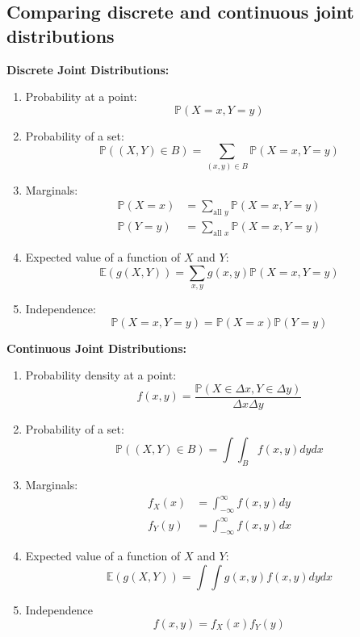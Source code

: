\documentclass[titlepage, 12pt, leqno]{article}
\begin{document}
\subsection{Comparing discrete and continuous joint distributions}
\begin{multicols}{2}
    \textbf{Discrete Joint Distributions:}
    \begin{enumerate}
        \item Probability at a point:
            \[
            \mathbb{P}(X=x, Y=y)
            \]
        \item Probability of a set:
            \[
            \mathbb{P}((X,Y) \in B) = 
            \sum_{(x,y) \in B}\mathbb{P}(X=x,Y=y)
            \]
        \item Marginals:
           \begin{align*}
               \mathbb{P}(X=x) &= \sum_{ \text{all $y$}} \mathbb{P}(X=x, Y=y) \\
               \mathbb{P}(Y=y) &= \sum_{ \text{all $x$}}\mathbb{P}(X=x,Y=y)
           \end{align*}

        \item Expected value of a function of $X$ and $Y$:
            \[
            \mathbb{E}(g(X,Y)) = \sum_{x,y}g(x,y)\mathbb{P}(X=x,Y=y)
            \]
        \item Independence:
            \[
            \mathbb{P}(X=x,Y=y) = \mathbb{P}(X=x)\mathbb{P}(Y=y)
            \]
    \end{enumerate}

\columnbreak

    \textbf{Continuous Joint Distributions:}
    \begin{enumerate}
        \item Probability density at a point:
            \[
            f(x,y) = \frac{\mathbb{P}(X \in \Delta x, Y \in \Delta y)}{
            \Delta x \Delta y}
            \]
        \item Probability of a set:
            \[
            \mathbb{P}((X,Y) \in B) = \int \int_{B}f(x,y)dydx
            \]
        \item Marginals:
           \begin{align*}
               f_X(x) &= \int_{-\infty}^{\infty}f(x,y)dy \\
               f_Y(y) &= \int_{-\infty}^{\infty}f(x,y)dx
           \end{align*}

        \item Expected value of a function of $X$ and $Y$:
            \[
            \mathbb{E}(g(X,Y)) = \int \int g(x,y)f(x,y)dydx
            \]
        \item Independence
            \[
            f(x,y) = f_X(x)f_Y(y)
            \]
    \end{enumerate}
\end{multicols}
\restoregeometry
\pagebreak
\end{document}
